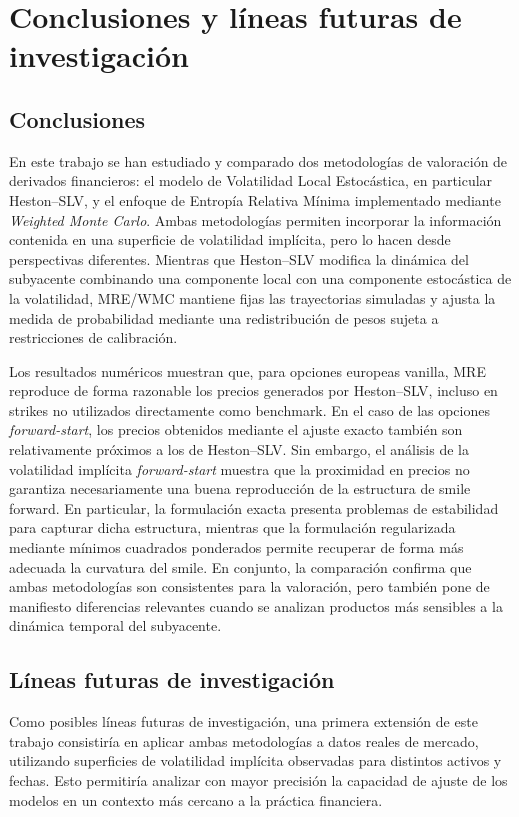 \chapter{Conclusiones y líneas futuras de investigación}

\section{Conclusiones}

En este trabajo se han estudiado y comparado dos metodologías de valoración de derivados financieros: el modelo de Volatilidad Local Estocástica, en particular Heston--SLV, y el enfoque de Entropía Relativa Mínima implementado mediante \textit{Weighted Monte Carlo}. Ambas metodologías permiten incorporar la información contenida en una superficie de volatilidad implícita, pero lo hacen desde perspectivas diferentes. Mientras que Heston--SLV modifica la dinámica del subyacente combinando una componente local con una componente estocástica de la volatilidad, MRE/WMC mantiene fijas las trayectorias simuladas y ajusta la medida de probabilidad mediante una redistribución de pesos sujeta a restricciones de calibración.\medskip

Los resultados numéricos muestran que, para opciones europeas vanilla, MRE reproduce de forma razonable los precios generados por Heston--SLV, incluso en strikes no utilizados directamente como benchmark. En el caso de las opciones \textit{forward-start}, los precios obtenidos mediante el ajuste exacto también son relativamente próximos a los de Heston--SLV. Sin embargo, el análisis de la volatilidad implícita \textit{forward-start} muestra que la proximidad en precios no garantiza necesariamente una buena reproducción de la estructura de smile forward. En particular, la formulación exacta presenta problemas de estabilidad para capturar dicha estructura, mientras que la formulación regularizada mediante mínimos cuadrados ponderados permite recuperar de forma más adecuada la curvatura del smile. En conjunto, la comparación confirma que ambas metodologías son consistentes para la valoración, pero también pone de manifiesto diferencias relevantes cuando se analizan productos más sensibles a la dinámica temporal del subyacente.


\section{Líneas futuras de investigación}

Como posibles líneas futuras de investigación, una primera extensión de este trabajo consistiría en aplicar ambas metodologías a datos reales de mercado, utilizando superficies de volatilidad implícita observadas para distintos activos y fechas. Esto permitiría analizar con mayor precisión la capacidad de ajuste de los modelos en un contexto más cercano a la práctica financiera.\medskip

